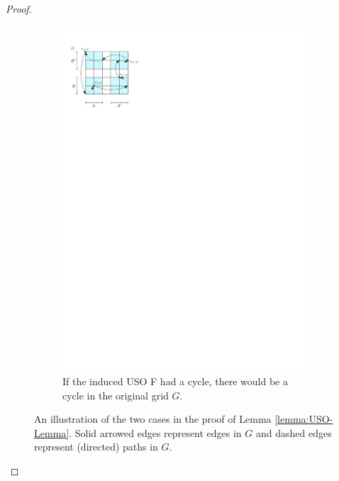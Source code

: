 \documentclass[a4paper,10pt]{article}
\begin{document}
\begin{proof}
\begin{figure}
\begin{subfigure}[t]{0.45\textwidth}
\includegraphics{product_lemma_cycle.pdf}
\caption{\small If the induced USO F had a cycle, there would be a cycle in the original grid $G$.}
\label{fig:InducedUSOcycle}
\end{subfigure}
\caption{An illustration of the two cases in the proof of Lemma \ref{lemma:USO-Lemma}. Solid arrowed edges represent edges in $G$ and dashed edges represent (directed) paths in $G$.}
\label{fig:inducesUSOboth}
\end{figure}

\end{proof}
\end{document}
